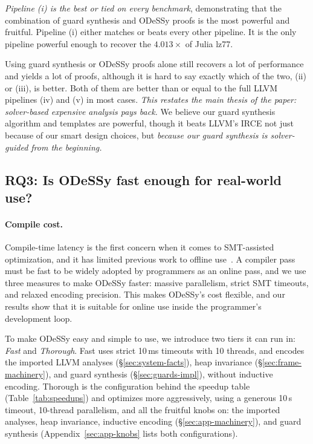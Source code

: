 \documentclass[acmsmall,screen,nonacm]{acmart}
\newcommand{\odessy}{ODeSSy}
\newcommand{\tool}{\odessy}
\begin{document}
\emph{Pipeline (i) is the best or tied on every benchmark}, demonstrating that the combination of guard synthesis and \tool{} proofs is the most powerful and fruitful. Pipeline (i) either matches or beats every other pipeline. It is the only pipeline powerful enough to recover the $4.013\times$ of Julia lz77. 

Using guard synthesis or \tool{} proofs alone still recovers a lot of performance and yields a lot of proofs, although it is hard to say exactly which of the two, (ii) or (iii), is better. Both of them are better than or equal to the full LLVM pipelines (iv) and (v) in most cases. \emph{This restates the main thesis of the paper: solver-based expensive analysis pays back.} We believe our guard synthesis algorithm and templates are powerful, though it beats LLVM's IRCE not just because of our smart design choices, but \emph{because our guard synthesis is solver-guided from the beginning.}
 

\subsection{RQ3: Is \tool{} fast enough for real-world use?}
\label{sec:results-cost}
\paragraph{Compile cost.}
Compile-time latency is the first concern when it comes to SMT-assisted optimization, and it has limited previous work to offline use~\cite{sasnauskas2017souper, schkufza2013stoke, taneja2020knownbits}. A compiler pass must be fast to be widely adopted by programmers as an online pass, and we use three measures to make \tool{} faster: massive parallelism, strict SMT timeouts, and relaxed encoding precision. This makes \tool{}'s cost flexible, and our results show that it is suitable for online use inside the programmer's development loop.

To make \tool{} easy and simple to use, we introduce two tiers it can run in: \emph{Fast} and \emph{Thorough}. Fast uses strict 10\,ms timeouts with 10 threads, and encodes the imported LLVM analyses (\S\ref{sec:system-facts}), heap invariance (\S\ref{sec:frame-machinery}), and guard synthesis (\S\ref{sec:guards-impl}), without inductive encoding. Thorough is the configuration behind the speedup table (Table~\ref{tab:speedups}) and optimizes more aggressively, using a generous 10\,s timeout, 10-thread parallelism, and all the fruitful knobs on: the imported analyses, heap invariance, inductive encoding (\S\ref{sec:app-machinery}), and guard synthesis (Appendix~\ref{sec:app-knobs} lists both configurations).
\end{document}
